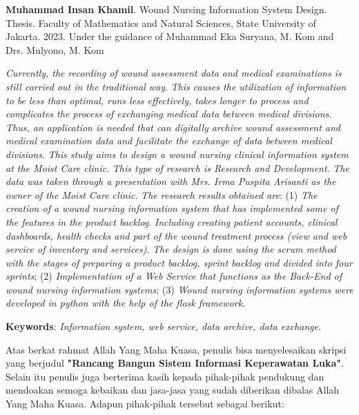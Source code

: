 \documentclass{jtetiskripsi}
\begin{document}
\begin{abstracteng}
	
	\textbf{Muhammad Insan Khamil}. Wound Nursing Information System Design. Thesis. Faculty of Mathematics and Natural Sciences, State University of Jakarta. 2023. Under the guidance of Muhammad Eka Suryana, M. Kom and Drs. Mulyono, M. Kom
	\vskip1cm
	
	\emph{Currently, the recording of wound assessment data and medical examinations is still carried out in the traditional way}. \emph{This causes the utilization of information to be less than optimal, runs less effectively, takes longer to process and complicates the process of exchanging medical data between medical divisions}. \emph{Thus, an application is needed that can digitally archive wound assessment and medical examination data and facilitate the exchange of data between medical divisions}. \emph{This study aims to design a wound nursing clinical information system at the Moist Care clinic}. \emph{This type of research is Research and Development}. \emph{The data was taken through a presentation with Mrs. Irma Puspita Arisanti as the owner of the Moist Care clinic}. \emph{The research results obtained are}: (1) \emph{The creation of a wound nursing information system that has implemented some of the features in the product backlog}. \emph{Including creating patient accounts, clinical dashboards, health checks and part of the wound treatment process (view and web service of inventory and services)}. \emph{The design is done using the scrum method with the stages of preparing a product backlog, sprint backlog and divided into four sprints}; (2) \emph{Implementation of a Web Service that functions as the Back-End of wound nursing information systems}; (3) \emph{Wound nursing information systems were developed in python with the help of the flask framework}.
	
	\bigskip
	\noindent
	\textbf{Keywords}: \emph{Information system, web service, data archive, data exchange}.
\end{abstracteng}





\preface
\pagestyle{chapterheading}
Atas berkat rahmat Allah Yang Maha Kuasa, penulis bisa menyelesaikan skripsi yang berjudul \textbf{"Rancang Bangun Sistem Informasi Keperawatan Luka"}. Selain itu penulis juga berterima kasih kepada pihak-pihak pendukung dan mendoakan semoga kebaikan dan jasa-jasa yang sudah diberikan dibalas Allah Yang Maha Kuasa. Adapun pihak-pihak tersebut sebagai berikut:
\end{document}
